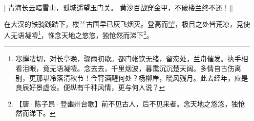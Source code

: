 
\begin{pcontent}{|}
青海长云暗雪山，孤城遥望玉门关。
黄沙百战穿金甲，不破楼兰终不还！||
\end{pcontent}

在大汉的铁骑践踏下，楼兰古国早已灰飞烟灭。登高而望，极目之处皆荒凉，竞使人无语凝噎\footnote{寒蝉凄切，对长亭晚，骤雨初歇。都门帐饮无绪，留恋处，兰舟催发。执手相看泪眼，竟无语凝噎。念去去，千里烟波，暮霭沉沉楚天阔。\cispace 多情自古伤离别，更那堪冷落清秋节！今宵酒醒何处？杨柳岸，晓风残月。此去经年，应是良辰好景虚设。便纵有千种风情，更与何人说？}，惟念天地之悠悠，独怆然而涕下\footnote{【唐·陈子昂·登幽州台歌】前不见古人，后不见来者。念天地之悠悠，独怆然而涕下。}。

